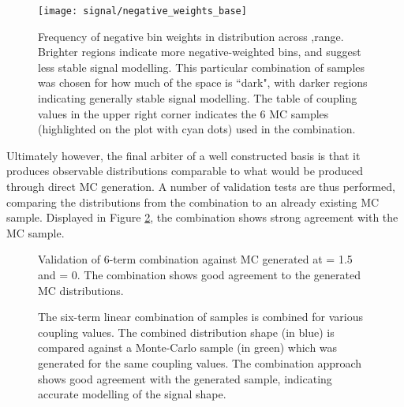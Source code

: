     \begin{figure}[tbh]
        \texttt{[image: signal/negative\_weights\_base]}
        \caption{
            Frequency of negative bin weights in \mhh distribution across \kvv,\kl range.
            Brighter regions indicate more negative-weighted bins, and suggest less stable signal modelling.
            This particular combination of samples was chosen for how much of the space is ``dark",
                with darker regions indicating generally stable signal modelling.
            The table of coupling values in the upper right corner indicates the 6 MC samples
                (highlighted on the plot with cyan dots) used in the combination.
        }
        \label{fig:vbf_hh_6term_nWeight_grid}
    \end{figure}

    Ultimately however, the final arbiter of a well constructed basis is that it produces observable distributions comparable to what would be produced through direct MC generation.
    A number of validation tests are thus performed, comparing the distributions from the combination to an already existing MC sample.
    Displayed in Figure \ref{fig:vbf_hh_6term_validation}, the combination shows strong agreement with the MC sample.

    \begin{figure}[tbh]
        \caption{
            Validation of 6-term combination against MC generated at \kv = 1.5 and \kl = 0.
            The combination shows good agreement to the generated MC distributions.
        }
        \label{fig:vbf_hh_6term_validation}
    \end{figure}

    \begin{figure}[tbh]
    	\centering
        \caption{
            The six-term linear combination of samples is combined for various coupling values.
            The combined distribution shape (in blue) is compared against a Monte-Carlo sample (in green) which was generated for the same coupling values.
            The combination approach shows good agreement with the generated sample, indicating accurate modelling of the signal shape.
        }
        \label{fig:vbf_hh_validation}
    \end{figure}

